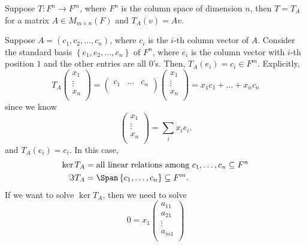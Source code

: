 \begin{eg}
    Suppose \(T: F^n \to F^m\), where \(F^n\) is the column space of dimension \(n\), then \(T = T_A\) for a matrix \(A \in M_{m \times n}(F)\) and \(T_A(v) = Av\).     
\end{eg}
\begin{explanation}
    Suppose \(A = (c_1, c_2, \dots , c_n)\), where \(c_i\) is the \(i\)-th  column vector of \(A\). Consider the standard basis \(\left\{ e_1, e_2, \dots , e_n \right\} \) of \(F^n\), where \(e_i\) is the column vector with \(i\)-th position \(1\) and the other entries are all \(0\)'s. Then, \(T_A(e_i) = c_i \in F^m\). Explicitly, 
    \[
        T_A \begin{pmatrix}
             x_1 \\
             \vdots \\
             x_n \\
        \end{pmatrix} = \begin{pmatrix}
            c_1 & \dots  & c_n  \\
        \end{pmatrix} \begin{pmatrix}
             x_1 \\
              \vdots\\
             x_n \\
        \end{pmatrix} = x_1 c_1 + \dots + x_n c_n
    \] since we know 
    \[
       \begin{pmatrix}
             x_1 \\
             \vdots \\
             x_n \\
        \end{pmatrix} = \sum_{i}x_i e_i.  
    \] and \(T_A(e_i) = c_i\).  In this case, 
    \begin{align*}
        \ker T_A &= \text{all linear relations among } c_1, \dots ,c_n \subseteq F^n \\
        \Im T_A &= \Span \left\{ c_1, \dots , c_n \right\} \subseteq F^m. 
    \end{align*}
    If we want to solve \(\ker T_A\), then we need to solve 
    \[
        0 = x_1 \begin{pmatrix}
             a_{11}  \\
             a_{21}  \\
             \vdots \\
             a_{m1} \\

\end{pmatrix}\]
\end{explanation}
